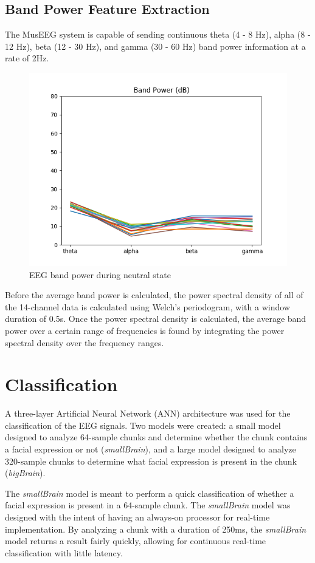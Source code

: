 \subsection{Band Power Feature Extraction}
The MusEEG system is capable of sending continuous theta (4 - 8 Hz),  alpha (8 - 12 Hz), beta (12 - 30 Hz), and gamma (30  - 60 Hz) band power information at a rate of 2Hz. 

\begin{figure}[htbp]
	\centering
		\includegraphics[width=0.8\columnwidth]{bandPower.png}
	\caption{EEG band power during neutral state}
	\label{fig:bandpower}
\end{figure}

Before the average band power is calculated, the power spectral density of all of the 14-channel data is calculated using Welch's periodogram, with a window duration of 0.5s. Once the power spectral density is calculated, the average band power over a certain range of frequencies is found by integrating the power spectral density over the frequency ranges. 

\section{Classification}
A three-layer Artificial Neural Network (ANN) architecture was used for the classification of the EEG signals. Two models were created: a small model designed to analyze 64-sample chunks and determine whether the chunk contains a facial expression or not (\textit{smallBrain}), and a large model designed to analyze 320-sample chunks to determine what facial expression is present in the chunk (\textit{bigBrain}).

The \textit{smallBrain} model is meant to perform a quick classification of whether a facial expression is present in a 64-sample chunk. The \textit{smallBrain} model was designed with the intent of having an always-on processor for real-time implementation. By analyzing a chunk with a duration of 250ms, the \textit{smallBrain} model returns a result fairly quickly, allowing for continuous real-time classification with little latency.

